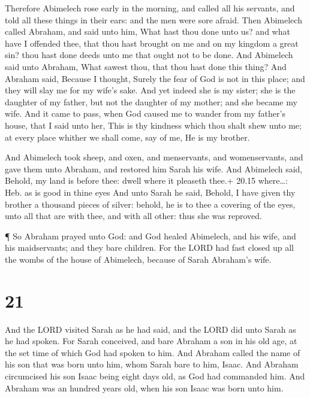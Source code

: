  Therefore Abimelech rose early in the morning, and called
all his servants, and told all these things in their ears: and the men
were sore afraid.  Then Abimelech called Abraham, and said
unto him, What hast thou done unto us? and what have I offended thee,
that thou hast brought on me and on my kingdom a great sin? thou hast
done deeds unto me that ought not to be done.  And
Abimelech said unto Abraham, What sawest thou, that thou hast done this
thing?  And Abraham said, Because I thought, Surely the
fear of God is not in this place; and they will slay me for my wife's
sake.  And yet indeed she is my sister; she is the daughter
of my father, but not the daughter of my mother; and she became my wife.
 And it came to pass, when God caused me to wander from my
father's house, that I said unto her, This is thy kindness which thou
shalt shew unto me; at every place whither we shall come, say of me, He
is my brother.

 And Abimelech took sheep, and oxen, and menservants, and
womenservants, and gave them unto Abraham, and restored him Sarah his
wife.  And Abimelech said, Behold, my land is before thee:
dwell where it pleaseth thee.+ 20.15 where\ldots: Heb. as is good in
thine eyes  And unto Sarah he said, Behold, I have given
thy brother a thousand pieces of silver: behold, he is to thee a
covering of the eyes, unto all that are with thee, and with all other:
thus she was reproved.

 ¶ So Abraham prayed unto God: and God healed Abimelech,
and his wife, and his maidservants; and they bare children.
 For the LORD had fast closed up all the wombs of the house
of Abimelech, because of Sarah Abraham's wife.

\hypertarget{section-20}{%
\section{21}\label{section-20}}

 And the LORD visited Sarah as he had said, and the LORD did
unto Sarah as he had spoken.  For Sarah conceived, and bare
Abraham a son in his old age, at the set time of which God had spoken to
him.  And Abraham called the name of his son that was born
unto him, whom Sarah bare to him, Isaac.  And Abraham
circumcised his son Isaac being eight days old, as God had commanded
him.  And Abraham was an hundred years old, when his son
Isaac was born unto him.

